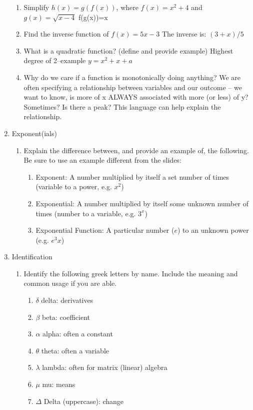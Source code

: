 \documentclass[11pt]{article}
\begin{document}
\begin{enumerate}
\begin{enumerate}
\item Simplify $h(x)=g(f(x))$, where $f(x)=x^2+4$ and $g(x)=\sqrt{x-4}$ \color{gray}f(g(x))=x \color{black}

\item Find the inverse function of $f(x)=5x-3$ \color{gray}The inverse is: $(3+x)/5$ \color{black}
\item What is a quadratic function? (define and provide example) \color{gray}Highest degree of 2--example $y=x^2+x+a$ \color{black}
\item Why do we care if a function is monotonically doing anything? \color{gray} We are often specifying a relationship between variables and our outcome -- we want to know, is more of x ALWAYS associated with more (or less) of y? Sometimes? Is there a peak? This language can help explain the relationship. \color{black}
\end{enumerate}


\item Exponent(ials)
\begin{enumerate}
\item Explain the difference between, and provide an example of, the following. Be sure to use an example different from the slides: 
	\begin{enumerate}
	\item Exponent: \color{gray} A number multiplied by itself a set number of times (variable to a power, e.g. $x^2$) \color{black}
	\item Exponential: \color{gray} A number multiplied by itself some unknown number of times (number to a variable, e.g. $3^x$) \color{black}
	\item Exponential Function:  \color{gray} A particular number ($e$) to an unknown power (e.g. $e^3x$) \color{black}
	\end{enumerate}
\end{enumerate}


\item Identification
\begin{enumerate}
\item Identify the following greek letters by name. Include the meaning and common usage if you are able. 
\begin{enumerate}
\item $\delta$ \color{gray}  delta: derivatives \color{black}
\item $\beta$ \color{gray}  beta: coefficient \color{black}
\item $\alpha$ \color{gray}  alpha: often a constant \color{black}
\item $\theta$\color{gray}  theta: often a variable \color{black}
\item $\lambda$ \color{gray} lambda: often for matrix (linear) algebra \color{black}
\item $\mu$\color{gray}  mu: means \color{black}
\item $\Delta$ \color{gray}  Delta (uppercase): change \color{black}
\end{enumerate}


\end{enumerate}
\end{enumerate}
\end{document}
